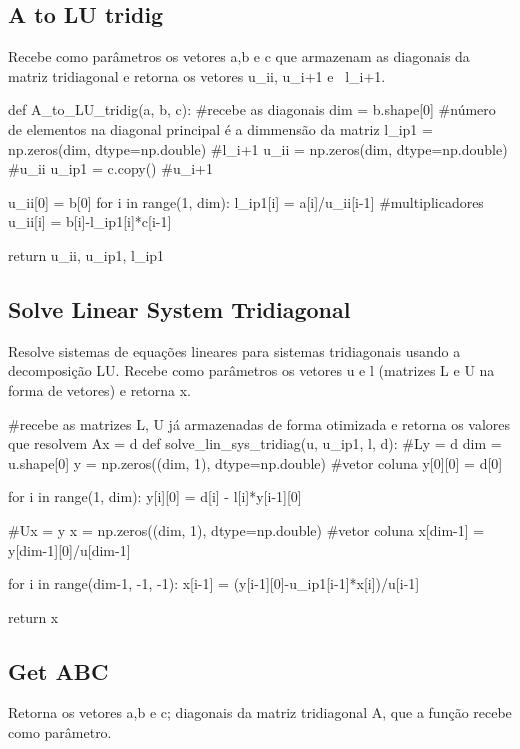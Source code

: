 \documentclass{article}
\begin{document}
\subsection{A to LU tridig}
 
 Recebe como parâmetros os vetores a,b e c que armazenam as diagonais da matriz tridiagonal e retorna os vetores u_{ii}, u_{i+1} e \ l_{i+1}.

\begin{python}
def A_to_LU_tridig(a, b, c): #recebe as diagonais
    dim = b.shape[0] #número de elementos na diagonal principal é a dimmensão da matriz
    l_ip1 = np.zeros(dim, dtype=np.double) #l_i+1
    u_ii = np.zeros(dim, dtype=np.double) #u_ii
    u_ip1 = c.copy() #u_i+1

    u_ii[0] = b[0]
    for i in range(1, dim):
        l_ip1[i] = a[i]/u_ii[i-1] #multiplicadores
        u_ii[i] = b[i]-l_ip1[i]*c[i-1]

    return u_ii, u_ip1, l_ip1
\end{python}

\subsection{Solve Linear System Tridiagonal}

Resolve sistemas de equações lineares para sistemas tridiagonais usando  a decomposição LU. Recebe como parâmetros os vetores u e l (matrizes L e U na forma de vetores) e retorna x. 

\begin{python}
#recebe as matrizes L, U já armazenadas de forma otimizada e retorna os valores que resolvem Ax = d
def solve_lin_sys_tridiag(u, u_ip1, l, d):
    #Ly = d
    dim = u.shape[0]
    y = np.zeros((dim, 1), dtype=np.double) #vetor coluna
    y[0][0] = d[0]

    for i in range(1, dim):
        y[i][0] = d[i] - l[i]*y[i-1][0]
    
    #Ux = y
    x = np.zeros((dim, 1), dtype=np.double) #vetor coluna
    x[dim-1] = y[dim-1][0]/u[dim-1]

    for i in range(dim-1, -1, -1):
        x[i-1] = (y[i-1][0]-u_ip1[i-1]*x[i])/u[i-1]

    return x
\end{python}
\subsection{Get ABC}

Retorna os vetores a,b e c; diagonais da matriz tridiagonal A, que a função recebe como parâmetro. 
\end{document}
